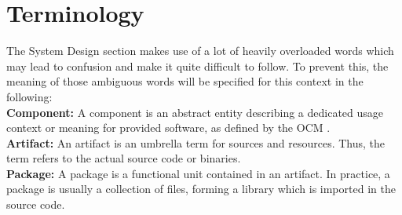 \section{Terminology}
The System Design section makes use of a lot of heavily overloaded words which may lead to confusion and make it quite difficult to follow. To prevent this, the meaning of those ambiguous words will be specified for this context in the following:\\

\noindent
\textbf{Component:} A component is an abstract entity describing a dedicated usage context or meaning for provided software, as defined by the OCM \cite{OCMSpec}.\\
\textbf{Artifact:} An artifact is an umbrella term for sources and resources. Thus, the term refers to the actual source code or binaries.\\
\textbf{Package:} A package is a functional unit contained in an artifact. In practice, a package is usually a collection of files, forming a library which is imported in the source code. 

